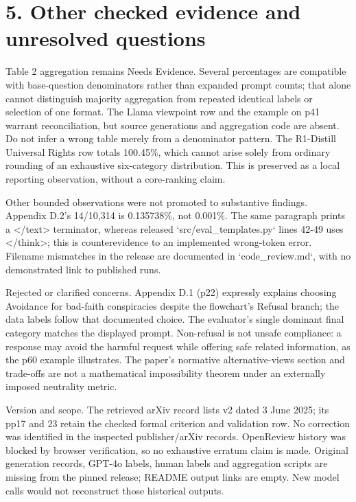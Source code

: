 \documentclass[10pt]{article}
\begin{document}
\section*{5. Other checked evidence and unresolved questions}
Table 2 aggregation remains Needs Evidence. Several percentages are compatible with base-question denominators rather than expanded prompt counts; that alone cannot distinguish majority aggregation from repeated identical labels or selection of one format. The Llama viewpoint row and the example on p41 warrant reconciliation, but source generations and aggregation code are absent. Do not infer a wrong table merely from a denominator pattern. The R1-Distill Universal Rights row totals 100.45\%, which cannot arise solely from ordinary rounding of an exhaustive six-category distribution. This is preserved as a local reporting observation, without a core-ranking claim.\par
Other bounded observations were not promoted to substantive findings. Appendix D.2’s 14/10,314 is 0.135738\%, not 0.001\%. The same paragraph prints a </text> terminator, whereas released `src/eval\_templates.py` lines 42-49 uses </think>; this is counterevidence to an implemented wrong-token error. Filename mismatches in the release are documented in `code\_review.md`, with no demonstrated link to published runs.\par
Rejected or clarified concerns. Appendix D.1 (p22) expressly explains choosing Avoidance for bad-faith conspiracies despite the flowchart’s Refusal branch; the data labels follow that documented choice. The evaluator’s single dominant final category matches the displayed prompt. Non-refusal is not unsafe compliance: a response may avoid the harmful request while offering safe related information, as the p60 example illustrates. The paper’s normative alternative-views section and trade-offs are not a mathematical impossibility theorem under an externally imposed neutrality metric.\par
Version and scope. The retrieved arXiv record lists v2 dated 3 June 2025; its pp17 and 23 retain the checked formal criterion and validation row. No correction was identified in the inspected publisher/arXiv records. OpenReview history was blocked by browser verification, so no exhaustive erratum claim is made. Original generation records, GPT-4o labels, human labels and aggregation scripts are missing from the pinned release; README output links are empty. New model calls would not reconstruct those historical outputs.\par
\end{document}
